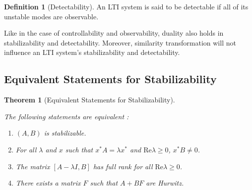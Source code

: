 \documentclass[
]{book}
\newtheorem{theorem}{Theorem}[chapter]
\theoremstyle{definition}
\newtheorem{definition}{Definition}[chapter]
\theoremstyle{definition}
\theoremstyle{definition}
\theoremstyle{definition}
\theoremstyle{remark}
\begin{document}
\begin{definition}[Detectability]
\protect\hypertarget{def:ltidetectable}{}\label{def:ltidetectable}An LTI system is said to be detectable if all of its unstable modes are observable.
\end{definition}

Like in the case of controllability and observability, duality also holds in stabilizability and detectability. Moreover, similarity transformation will not influence an LTI system's stabilizability and detectability.

\subsection{Equivalent Statements for Stabilizability}\label{equivalent-statements-for-stabilizability}

\begin{theorem}[Equivalent Statements for Stabilizability]
\protect\hypertarget{thm:ltistabilizable}{}\label{thm:ltistabilizable}

The following statements are equivalent \citep{zhou1996book-robust}:

\begin{enumerate}
\def\labelenumi{\arabic{enumi}.}
\item
  \((A,B)\) is stabilizable.
\item
  For all \(\lambda\) and \(x\) such that \(x^* A = \lambda x^*\) and \(\text{Re} \lambda \ge 0\), \(x^* B \ne 0\).
\item
  The matrix \([A-\lambda I, B]\) has full rank for all \(\text{Re} \lambda \ge 0\).
\item
  There exists a matrix \(F\) such that \(A+BF\) are Hurwitz.
\end{enumerate}

\end{theorem}
\end{document}

